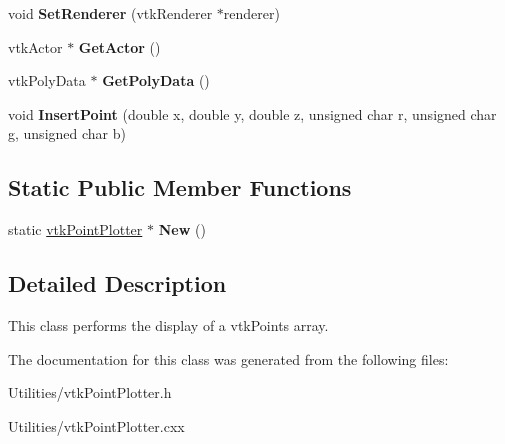 \begin{DoxyCompactItemize}
\item 
\hypertarget{classvtkPointPlotter_ae08aa847999e303e9023f0e60001cc3f}{
void {\bfseries SetRenderer} (vtkRenderer $\ast$renderer)}
\label{classvtkPointPlotter_ae08aa847999e303e9023f0e60001cc3f}

\item 
\hypertarget{classvtkPointPlotter_af741f07ca30d70efecb5a28a0c88b248}{
vtkActor $\ast$ {\bfseries GetActor} ()}
\label{classvtkPointPlotter_af741f07ca30d70efecb5a28a0c88b248}

\item 
\hypertarget{classvtkPointPlotter_a0badd2ebff0f044b7da6d22277408563}{
vtkPolyData $\ast$ {\bfseries GetPolyData} ()}
\label{classvtkPointPlotter_a0badd2ebff0f044b7da6d22277408563}

\item 
\hypertarget{classvtkPointPlotter_a02cb01481dcaa4d5fb093c254834c901}{
void {\bfseries InsertPoint} (double x, double y, double z, unsigned char r, unsigned char g, unsigned char b)}
\label{classvtkPointPlotter_a02cb01481dcaa4d5fb093c254834c901}

\end{DoxyCompactItemize}
\subsection*{Static Public Member Functions}
\begin{DoxyCompactItemize}
\item 
\hypertarget{classvtkPointPlotter_a649b3bdae9b43324fceec259edea1e67}{
static \hyperlink{classvtkPointPlotter}{vtkPointPlotter} $\ast$ {\bfseries New} ()}
\label{classvtkPointPlotter_a649b3bdae9b43324fceec259edea1e67}

\end{DoxyCompactItemize}


\subsection{Detailed Description}
This class performs the display of a vtkPoints array. 

The documentation for this class was generated from the following files:\begin{DoxyCompactItemize}
\item 
Utilities/vtkPointPlotter.h\item 
Utilities/vtkPointPlotter.cxx\end{DoxyCompactItemize}
